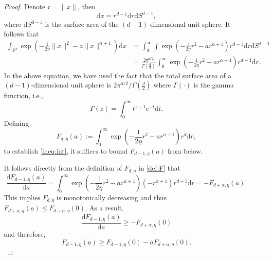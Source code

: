 \documentclass[10pt,a4paper]{amsart}
\newcommand{\R}{\mathbb{R}}
\newcommand{\nn}{\nonumber}
\newcommand{\rd}{\mathrm{d}}
\begin{document}
\begin{proof}
Denote $r=\|x\|$, then
\[
\rd x= r^{d-1} \rd r \rd S^{d-1},
\]
where $ \rd S^{d-1} $ is the surface area of the $ (d-1) $-dimensional unit sphere.
It follows that
\begin{align}
  \int_{\R^d} \exp\left(-\frac{1}{2\eta}\|x\|^2 - a\|x\|^{\alpha+1} \right) \rd x &= \int_0^\infty \int \exp\left(-\frac{1}{2\eta}r^2 - a r^{\alpha+1} \right) r^{d-1} \rd r \rd S^{d-1} \nn \\
&= \frac{2 \pi^{d/2}}{\Gamma\left( \frac d2 \right) } \int_0^\infty \exp\left( -\frac{1}{2\eta}r^2 - a r^{\alpha+1} \right) r^{d-1} \rd r.  \label{eq:int}
\end{align}
In the above equation, we have used the fact that the total surface area of a $ (d-1) $-dimensional unit sphere is $2 \pi^{d/2}/\Gamma\left( \frac d2 \right)$ where $\Gamma(\cdot)$ is the gamma function, i.e.,
\begin{equation}\label{eq:gamma}
        \Gamma(z)=\int_0^\infty t^{z-1} e^{-t} \rd t.
    \end{equation} 
Defining
\begin{equation}\label{def:F}
    F_{d,\eta}(a):= \int_0^\infty \exp\left( -\frac{1}{2\eta}r^2 - a r^{\alpha+1} \right) r^{d} \rd r,
\end{equation}
to establish \eqref{ineq:int},
it suffices to bound $F_{d-1,\eta}(a)$ from below.

It follows directly from the definition of $F_{d,\eta}$ in \eqref{def:F} that
\[
\frac{\rd F_{d-1,\eta}(a)}{\rd a}=\int_0^\infty \exp\left( -\frac{1}{2\eta}r^2 - a r^{\alpha+1} \right) (-r^{\alpha+1}) r^{d-1} \rd r 
=- F_{d+\alpha,\eta}(a).
\]
This implies $F_{d,\eta}$ is monotonically decreasing and thus $F_{d+\alpha,\eta}(a)\le F_{d+\alpha,\eta}(0)$. As a result,
    \[
        \frac{\rd F_{d-1,\eta}(a)}{\rd a} \ge - F_{d+\alpha,\eta}(0)
    \]
and therefore,
\begin{equation}\label{ineq:F}
    F_{d-1,\eta}(a) \ge F_{d-1,\eta}(0) - a F_{d+\alpha,\eta}(0).
\end{equation}


\end{proof}
\end{document}
